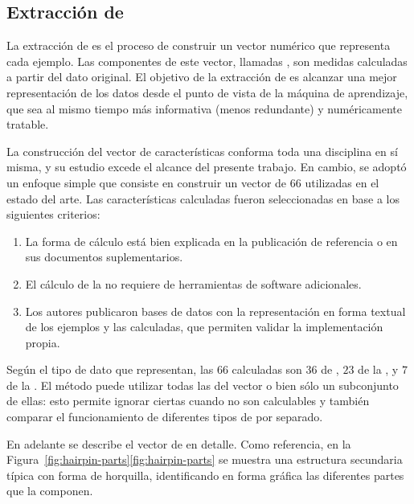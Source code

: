 %
%
\subsection{Extracción de }
%
La extracción de  es el proceso de construir un vector
numérico que representa cada ejemplo.
Las componentes de este vector, llamadas , son
medidas calculadas a partir del dato original.
El objetivo de la extracción de  es alcanzar una mejor
representación de los datos desde el punto de vista de la máquina de
aprendizaje, que sea al mismo tiempo más informativa (menos
redundante) y numéricamente tratable.

La construcción del vector de características conforma toda una
disciplina en sí misma, y su estudio excede el alcance del presente
trabajo.
En cambio, se adoptó un enfoque simple que consiste en construir un
vector de $66$  utilizadas en el estado del arte.
Las características calculadas fueron seleccionadas en base a los
siguientes criterios:
%
\begin{enumerate}
\item
  La forma de cálculo está bien explicada en la publicación de
  referencia o en sus documentos suplementarios.
\item
  El cálculo de la \caract{} no requiere de herramientas de software
  adicionales.
\item
  Los autores publicaron bases de datos con la representación en forma
  textual de los ejemplos y las  calculadas, que permiten
  validar la implementación propia.
\end{enumerate}
%
Según el tipo de dato que representan, las $66$  calculadas
son $36$  de , $23$  de la
, y $7$ de la .
El método puede utilizar todas las  del vector o bien sólo
un subconjunto de ellas: esto permite ignorar ciertas 
cuando no son calculables y también comparar el funcionamiento de
diferentes tipos de  por separado.

En adelante se describe el vector de  en detalle.
Como referencia, en la
\iflatexml{}Figura~\ref{fig:hairpin-parts}\else\autoref{fig:hairpin-parts}\fi{}
se muestra una estructura secundaria típica con forma de horquilla,
identificando en forma gráfica las diferentes partes que la componen.
